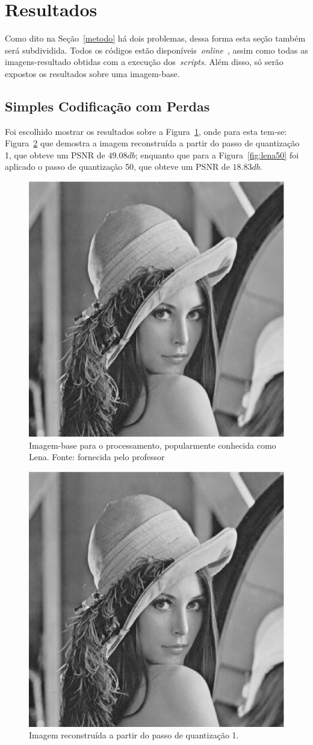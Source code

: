 \documentclass[conference]{Trabalho_3}
\begin{document}
\section{Resultados}
  \label{resut}
Como dito na Se\c{c}\~ao~\ref{metodo} h\'a dois problemas, dessa forma esta se\c{c}\~ao tamb\'em ser\'a subdividida. Todos os c\'odigos est\~ao dispon\'iveis~\textit{online}~\cite{down}, assim como todas as imagens-resultado obtidas com a execu\c{c}\~ao dos~\textit{scripts}. Al\'em disso, s\'o ser\~ao expostos os resultados sobre uma imagem-base.

\subsection{Simples Codifica\c{c}\~ao com Perdas}
  \label{codilossy_result}
Foi escolhido mostrar os resultados sobre a Figura~\ref{fig:lena}, onde para esta tem-se: Figura~\ref{fig:lena1} que demostra a imagem reconstru\'ida a partir do passo de quantiza\c{c}\~ao 1, que obteve um PSNR de $49.08 db$; enquanto que para a Figura~\ref{fig:lena50} foi aplicado o passo de quantiza\c{c}\~ao 50, que obteve um PSNR de $18.83 db$.

\begin{figure}[!t]
  \centering
  \includegraphics[width = 5 cm]{lena}
  \caption{Imagem-base para o processamento, popularmente conhecida como Lena. Fonte: fornecida pelo professor}
  \label{fig:lena}
\end{figure}

\begin{figure}[!t]
  \centering
  \includegraphics[width = 5 cm]{lena_1}
  \caption{Imagem reconstru\'ida a partir do passo de quantiza\c{c}\~ao 1.}
  \label{fig:lena1}
\end{figure}
\end{document}
